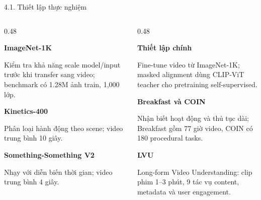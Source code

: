\documentclass[aspectratio=169,9pt]{beamer}
\newcommand{\smallnote}[1]{{\fontsize{7.1}{8.4}\selectfont #1\par}}
\newcommand{\source}[1]{}
\newcommand{\heading}[1]{{\bfseries\color{PTITRed} #1\par}}
\begin{document}
\begin{frame}{4.1. Thiết lập thực nghiệm}
  \vspace{0.10cm}
  \begin{columns}[T,onlytextwidth]
    \begin{column}{0.48\textwidth}
      \begin{tcolorbox}[titlepanel,title=Scale up trên ảnh,equal height group=s7_top]
        \heading{ImageNet-1K}
        \smallnote{Kiểm tra khả năng scale model/input trước khi transfer sang video; benchmark có 1.28M ảnh train, 1,000 lớp.}
      \end{tcolorbox}
      \vspace{0.14cm}
      \begin{tcolorbox}[titlepanel,title=Video ngắn,equal height group=s7_bot]
        \heading{Kinetics-400}
        \smallnote{Phân loại hành động theo scene; video trung bình 10 giây.}
        \vspace{0.08cm}
        \heading{Something-Something V2}
        \smallnote{Nhạy với diễn biến thời gian; video trung bình 4 giây.}
      \end{tcolorbox}
    \end{column}
    \begin{column}{0.48\textwidth}
      \begin{tcolorbox}[greenpanel,equal height group=s7_top]
        \heading{Thiết lập chính}
        Fine-tune video từ ImageNet-1K; masked alignment dùng CLIP-ViT teacher cho pretraining self-supervised.
      \end{tcolorbox}
      \vspace{0.14cm}
      \begin{tcolorbox}[titlepanel,title=Video dài,equal height group=s7_bot]
        \heading{Breakfast và COIN}
        \smallnote{Nhận biết hoạt động và thủ tục dài; Breakfast gồm 77 giờ video, COIN có 180 procedural tasks.}
        \vspace{0.08cm}
        \heading{LVU}
        \smallnote{Long-form Video Understanding: clip phim 1--3 phút, 9 tác vụ content, metadata và user engagement.}
      \end{tcolorbox}
    \end{column}
  \end{columns}
  \vfill
  \source{Nguồn: VideoMamba, Sections 4.1--4.4.}
\end{frame}
\end{document}
